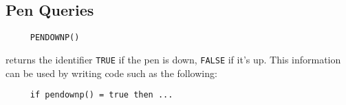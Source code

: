 





\subsection{Pen Queries}

\begin{verbatim}
     PENDOWNP()
\end{verbatim}
returns the identifier \texttt{TRUE} if the pen is down,
\texttt{FALSE} if it's up.  This information can be used by writing
code such as the following:
\begin{verbatim}
     if pendownp() = true then ...
\end{verbatim}



